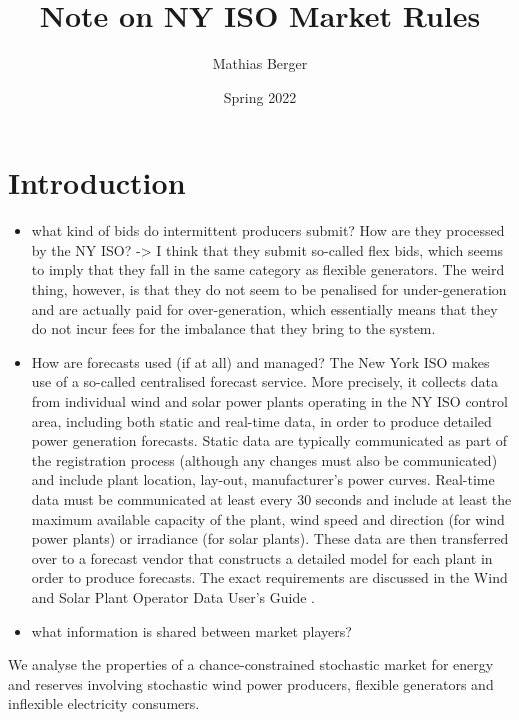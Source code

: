 \documentclass{article}
\title{Note on NY ISO Market Rules}
\author{Mathias Berger}
\date{Spring 2022}
\begin{document}
\maketitle

\section{Introduction}

\begin{itemize}
\item what kind of bids do intermittent producers submit? How are they processed by the NY ISO? -> I think that they submit so-called flex bids, which seems to imply that they fall in the same category as flexible generators. The weird thing, however, is that they do not seem to be penalised for under-generation and are actually paid for over-generation, which essentially means that they do not incur fees for the imbalance that they bring to the system. 
\item How are forecasts used (if at all) and managed? The New York ISO makes use of a so-called centralised forecast service. More precisely, it collects data from individual wind and solar power plants operating in the NY ISO control area, including both static and real-time data, in order to produce detailed power generation forecasts. Static data are typically communicated as part of the registration process (although any changes must also be communicated) and include plant location, lay-out, manufacturer's power curves. Real-time data must be communicated at least every 30 seconds and include at least the maximum available capacity of the plant, wind speed and direction (for wind power plants) or irradiance (for solar plants). These data are then transferred over to a forecast vendor that constructs a detailed model for each plant in order to produce forecasts. The exact requirements are discussed in the Wind and Solar Plant Operator Data User's Guide \cite{WSDataUserGuide}.
\item what information is shared between market players?
\end{itemize}
We analyse the properties of a chance-constrained stochastic market for energy and reserves involving stochastic wind power producers, flexible generators and inflexible electricity consumers. 


\end{document}

